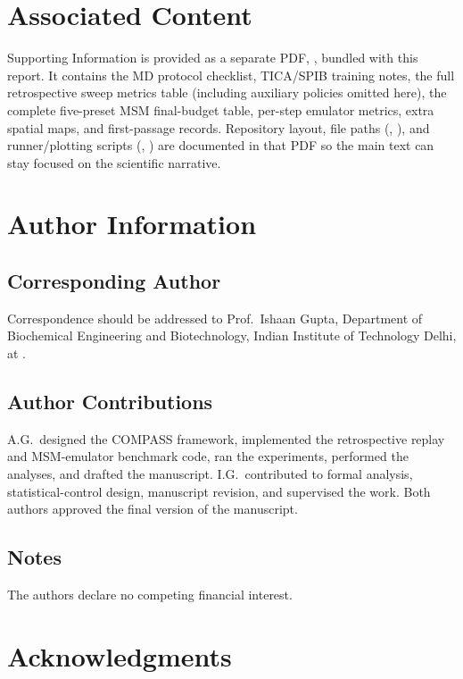 \documentclass[journal=jctcce,manuscript=article,layout=twocolumn]{achemso}
\begin{document}
\section{Associated Content}

Supporting Information is provided as a separate PDF, , bundled with this report.
It contains the MD protocol checklist, TICA/SPIB training notes, the full retrospective sweep metrics table (including auxiliary policies omitted here), the complete five-preset MSM final-budget table, per-step emulator metrics, extra spatial maps, and first-passage records.
Repository layout, file paths (, ), and runner/plotting scripts (, ) are documented in that PDF so the main text can stay focused on the scientific narrative.

\section{Author Information}

\subsection{Corresponding Author}
Correspondence should be addressed to Prof.\ Ishaan Gupta, Department of Biochemical Engineering and Biotechnology, Indian Institute of Technology Delhi, at .

\subsection{Author Contributions}
A.G.\ designed the COMPASS framework, implemented the retrospective replay and MSM-emulator benchmark code, ran the experiments, performed the analyses, and drafted the manuscript. I.G.\ contributed to formal analysis, statistical-control design, manuscript revision, and supervised the work. Both authors approved the final version of the manuscript.

\subsection{Notes}
The authors declare no competing financial interest.

\section{Acknowledgments}
\end{document}
